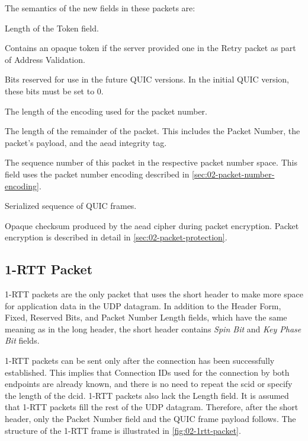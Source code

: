 The semantics of the new fields in these packets are:

\begin{description}

     Length of the Token field.

     Contains an opaque token if the server provided one in
the Retry packet as part of Address Validation.

     Bits reserved for use in the future QUIC versions. In the initial QUIC
version, these bits must be set to 0.

     The length of the encoding used for the packet number.

     The length of the remainder of the packet. This includes the Packet Number, the
packet's payload, and the \gls{aead} integrity tag.

     The sequence number of this packet in the respective packet number space.
This field uses the packet number encoding described in \autoref{sec:02-packet-number-encoding}.

     Serialized sequence of QUIC frames.

     Opaque checksum produced by the \gls{aead} cipher during packet encryption.
Packet encryption is described in detail in \autoref{sec:02-packet-protection}.

\end{description}

\subsection{1-RTT Packet}

1-RTT packets are the only packet that uses the short header to make more space for application data
in the UDP datagram. In addition to the Header Form, Fixed, Reserved Bits, and Packet Number Length
fields, which have the same meaning as in the long header, the short header contains \textit{Spin
Bit} and \textit{Key Phase Bit} fields.

1-RTT packets can be sent only after the connection has been successfully established. This implies
that Connection IDs used for the connection by both endpoints are already known, and there is no
need to repeat the \gls{scid} or specify the length of the \gls{dcid}\@. 1-RTT packets also lack the
Length field. It is assumed that 1-RTT packets fill the rest of the UDP datagram. Therefore, after
the short header, only the Packet Number field and the QUIC frame payload follows. The structure of
the 1-RTT frame is illustrated in \autoref{fig:02-1rtt-packet}.

